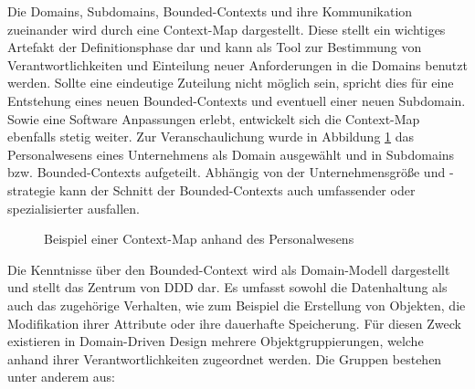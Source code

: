 Die  Domains, Subdomains, Bounded-Contexts und ihre Kommunikation zueinander wird durch eine Context-Map dargestellt. Diese stellt ein wichtiges Artefakt der Definitionsphase dar und kann als Tool zur Bestimmung von Verantwortlichkeiten und Einteilung neuer Anforderungen in die Domains benutzt werden. Sollte eine eindeutige Zuteilung nicht möglich sein, spricht dies für eine Entstehung eines neuen Bounded-Contexts und eventuell einer neuen Subdomain. Sowie eine Software Anpassungen erlebt, entwickelt sich die Context-Map ebenfalls stetig weiter. Zur Veranschaulichung wurde in Abbildung \ref{fig:Context-Map-Example} das Personalwesens eines Unternehmens als Domain ausgewählt und in Subdomains bzw. Bounded-Contexts aufgeteilt. Abhängig von der Unternehmensgröße und -strategie kann der Schnitt der Bounded-Contexts auch umfassender oder spezialisierter ausfallen.


\begin{figure}
	\centering
	
	\caption{Beispiel einer Context-Map anhand des Personalwesens}
	\label{fig:Context-Map-Example}
\end{figure}

Die Kenntnisse über den Bounded-Context wird als Domain-Modell dargestellt und stellt das Zentrum von DDD dar. Es umfasst sowohl die Datenhaltung als auch das zugehörige Verhalten, wie zum Beispiel die Erstellung von Objekten, die Modifikation ihrer Attribute oder ihre dauerhafte Speicherung. Für diesen Zweck existieren in Domain-Driven Design mehrere Objektgruppierungen, welche anhand ihrer Verantwortlichkeiten zugeordnet werden. Die Gruppen bestehen unter anderem aus:

